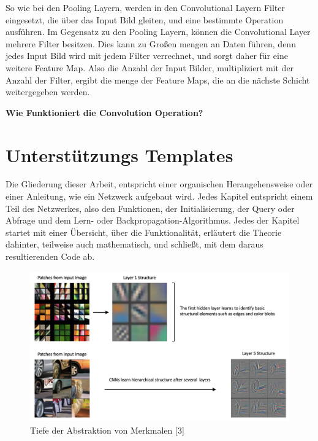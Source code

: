\documentclass[12pt]{article}
\begin{document}
So wie bei den Pooling Layern, werden in den Convolutional Layern Filter eingesetzt, die über das Input Bild gleiten, und eine bestimmte Operation ausführen. Im Gegensatz zu den Pooling Layern, können die Convolutional Layer mehrere Filter besitzen. Dies kann zu Großen mengen an Daten führen, denn jedes Input Bild wird mit jedem Filter verrechnet, und sorgt daher für eine weitere Feature Map. Also die Anzahl der Input Bilder, multipliziert mit der Anzahl der Filter, ergibt die menge der Feature Maps, die an die nächste Schicht weitergegeben werden.

\textbf{Wie Funktioniert die Convolution Operation?}


















\cleardoublepage
\section{Unterstützungs Templates}
Die Gliederung dieser Arbeit, entspricht einer organischen Herangehensweise oder einer Anleitung, wie ein Netzwerk aufgebaut wird. Jedes Kapitel entspricht einem Teil des Netzwerkes, also den Funktionen, der Initialisierung, der Query oder Abfrage und dem Lern- oder Backpropagation-Algorithmus. Jedes der Kapitel startet mit einer Übersicht, über die Funktionalität, erläutert die Theorie dahinter, teilweise auch mathematisch, und schließt, mit dem daraus resultierenden Code ab. 


\begin{figure}[H]
\centering
\includegraphics[scale=0.27]{./Images/tensorflow-keras-cnn-hierarchical-structure.png}
\caption{Tiefe der Abstraktion von Merkmalen [3]}
\label{Tiefe der Abstraktion von Merkmalen [3]}
\end{figure}
\end{document}
